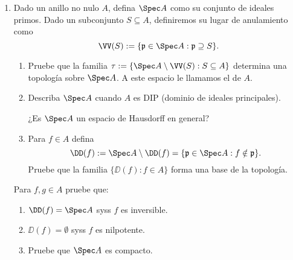 \documentclass[11pt, reqno]{amsart}
\begin{document}
\begin{enumerate}
	\item Dado un anillo no nulo $A$, defina $\Spec A$ como su conjunto de ideales primos.
		Dado un subconjunto $S \subseteq A$, definiremos su lugar de anulamiento como
		\[
			\VV(S) := \{ \mathfrak{p} \in \Spec A : \mathfrak{p} \supseteq S \}.
		\]
		\begin{enumerate}
			\item Pruebe que la familia $\tau := \{ \Spec A \setminus \VV(S) : S \subseteq A \}$ determina
				una topología sobre $\Spec A$.
				A este espacio le llamamos el  de $A$.
			\item Describa $\Spec A$ cuando $A$ es DIP (dominio de ideales principales).

				\lookup
				¿Es $\Spec A$ un espacio de Hausdorff en general?
			\item Para $f \in A$ defina
				\[
					\DD(f) := \Spec A \setminus \DD(f) = \{ \mathfrak{p} \in \Spec A : f \notin \mathfrak{p} \}.
				\]
				Pruebe que la familia $\{ \DD(f) : f\in A \}$ forma una base de la topología.
		\end{enumerate}
		Para $f, g \in A$ pruebe que:
		\begin{enumerate}[resume]
			\item $\DD(f) = \Spec A$ syss $f$ es inversible.
			\item $\DD(f) = \emptyset$ syss $f$ es nilpotente.
			\item\lookst
				Pruebe que $\Spec A$ es compacto.


\end{enumerate}
\end{enumerate}
\end{document}
